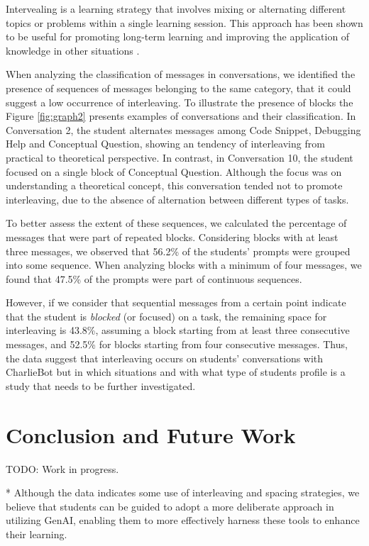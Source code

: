 \documentclass[a4paper,twoside]{article}
\begin{document}
Intervealing is a learning strategy that involves mixing or alternating
different topics or problems within a single learning session. This approach has
been shown to be useful for promoting long-term learning and improving the
application of knowledge in other situations \citep{Rivers21}.

When analyzing the classification of messages in conversations, we identified
the presence of sequences of messages belonging to the same category, that it
could suggest a low occurrence of interleaving. To illustrate the presence of
blocks the Figure \ref{fig:graph2} presents examples of conversations and their
classification. In Conversation 2, the student alternates messages among Code
Snippet, Debugging Help and Conceptual Question, showing an tendency of
interleaving from practical to theoretical perspective. In contrast, in
Conversation 10, the student focused on a single block of Conceptual Question.
Although the focus was on understanding a theoretical concept, this conversation
tended not to promote interleaving, due to the absence of alternation between
different types of tasks.

To better assess the extent of these sequences, we calculated the percentage of
messages that were part of repeated blocks. Considering blocks with at least
three messages, we observed that 56.2\% of the students' prompts were grouped
into some sequence. When analyzing blocks with a minimum of four messages, we
found that 47.5\% of the prompts were part of continuous sequences.

However, if we consider that sequential messages from a certain point indicate
that the student is \textit{blocked} (or focused) on a task, the remaining space
for interleaving is 43.8\%, assuming a block starting from at least three
consecutive messages, and 52.5\% for blocks starting from four consecutive
messages. Thus, the data suggest that interleaving occurs on students'
conversations with CharlieBot but in which situations and with what type of
students profile is a study that needs to be further investigated.

\section{Conclusion and Future Work}

TODO: Work in progress.

* Although the data indicates some use of interleaving and spacing strategies,
we believe that students can be guided to adopt a more deliberate approach in
utilizing GenAI, enabling them to more effectively harness these tools to
enhance their learning.
\end{document}

